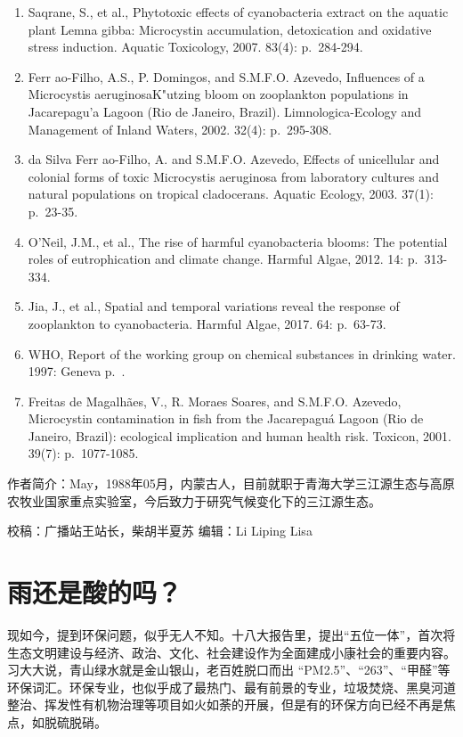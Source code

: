 \documentclass[
]{book}
\begin{document}
\begin{enumerate}
\item
  Saqrane, S., et al., Phytotoxic effects of cyanobacteria extract on the aquatic plant Lemna gibba: Microcystin accumulation, detoxication and oxidative stress induction. Aquatic Toxicology, 2007. 83(4): p.~284-294.
\item
  Ferr ao-Filho, A.S., P. Domingos, and S.M.F.O. Azevedo, Influences of a Microcystis aeruginosaK"utzing bloom on zooplankton populations in Jacarepagu'a Lagoon (Rio de Janeiro, Brazil). Limnologica-Ecology and Management of Inland Waters, 2002. 32(4): p.~295-308.
\item
  da Silva Ferr ao-Filho, A. and S.M.F.O. Azevedo, Effects of unicellular and colonial forms of toxic Microcystis aeruginosa from laboratory cultures and natural populations on tropical cladocerans. Aquatic Ecology, 2003. 37(1): p.~23-35.
\item
  O'Neil, J.M., et al., The rise of harmful cyanobacteria blooms: The potential roles of eutrophication and climate change. Harmful Algae, 2012. 14: p.~313-334.
\item
  Jia, J., et al., Spatial and temporal variations reveal the response of zooplankton to cyanobacteria. Harmful Algae, 2017. 64: p.~63-73.
\item
  WHO, Report of the working group on chemical substances in drinking water. 1997: Geneva p.~.
\item
  Freitas de Magalhães, V., R. Moraes Soares, and S.M.F.O. Azevedo, Microcystin contamination in fish from the Jacarepaguá Lagoon (Rio de Janeiro, Brazil): ecological implication and human health risk. Toxicon, 2001. 39(7): p.~1077-1085.
\end{enumerate}

作者简介：May，1988年05月，内蒙古人，目前就职于青海大学三江源生态与高原农牧业国家重点实验室，今后致力于研究气候变化下的三江源生态。

校稿：广播站王站长，柴胡半夏苏
编辑：Li Liping Lisa

\hypertarget{ux96e8ux8fd8ux662fux9178ux7684ux5417}{%
\section{雨还是酸的吗？}\label{ux96e8ux8fd8ux662fux9178ux7684ux5417}}

现如今，提到环保问题，似乎无人不知。十八大报告里，提出``五位一体''，首次将生态文明建设与经济、政治、文化、社会建设作为全面建成小康社会的重要内容。习大大说，青山绿水就是金山银山，老百姓脱口而出 ``PM2.5''、``263''、``甲醛''等环保词汇。环保专业，也似乎成了最热门、最有前景的专业，垃圾焚烧、黑臭河道整治、挥发性有机物治理等项目如火如荼的开展，但是有的环保方向已经不再是焦点，如脱硫脱硝。
\end{document}
